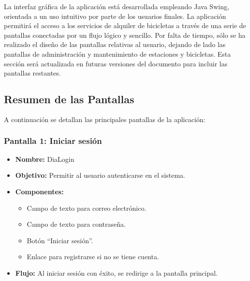     La interfaz gráfica de la aplicación está desarrollada empleando Java Swing, orientada a un uso intuitivo por parte de los usuarios finales.
    La aplicación permitirá el acceso a los servicios de alquiler de bicicletas a través de una serie de pantallas conectadas por un flujo lógico y sencillo.
    Por falta de tiempo, sólo se ha realizado el diseño de las pantallas relativas al usuario, dejando de lado las pantallas de administración y mantenimiento de estaciones y bicicletas.
    Esta sección será actualizada en futuras versiones del documento para incluir las pantallas restantes.

    \subsection{Resumen de las Pantallas}\label{subsec:resumen-de-las-pantallas}

    A continuación se detallan las principales pantallas de la aplicación:

    \subsubsection{Pantalla 1: Iniciar sesión}
    \begin{itemize}
        \item \textbf{Nombre:} DiaLogin
        \item \textbf{Objetivo:} Permitir al usuario autenticarse en el sistema.
        \item \textbf{Componentes:}
        \begin{itemize}
            \item Campo de texto para correo electrónico.
            \item Campo de texto para contraseña.
            \item Botón ``Iniciar sesión''.
            \item Enlace para registrarse si no se tiene cuenta.
        \end{itemize}
        \item \textbf{Flujo:} Al iniciar sesión con éxito, se redirige a la pantalla principal.
    \end{itemize}

